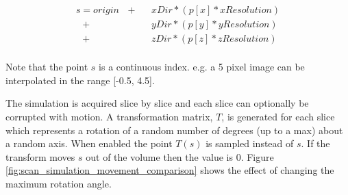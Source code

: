 \begin{align*}
	 s = origin \text{ }+\text{ }& xDir * (p[x] * xResolution) \nonumber \\
 	  			\text{ }+\text{ }& yDir * (p[y] * yResolution) \nonumber \\
 	  			\text{ }+\text{ }& zDir * (p[z] * zResolution) \nonumber \\ 	  			
\end{align*}

Note that the point $s$ is a continuous index. e.g. a 5 pixel image can be interpolated in the range [-0.5, 4.5].

The simulation is acquired slice by slice and each slice can optionally be corrupted with motion. A transformation matrix, $T$, is generated for each slice which represents a rotation of a random number of degrees (up to a max) about a random axis. When enabled the point $T(s)$ is sampled instead of $s$. If the transform moves $s$ out of the volume then the value is 0. Figure \ref{fig:scan_simulation_movement_comparison} shows the effect of changing the maximum rotation angle.

